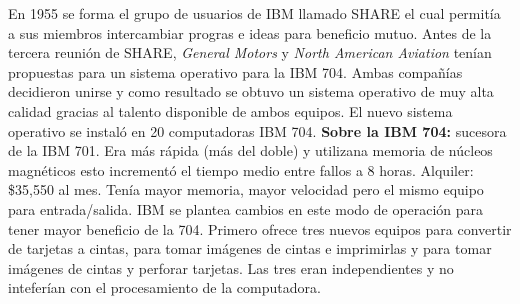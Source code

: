 En 1955 se forma el grupo de usuarios de \textsc{IBM} llamado \textsc{SHARE} el cual permitía a sus miembros intercambiar progras e ideas para beneficio mutuo. Antes de la tercera reunión de \textsc{SHARE}, \textit{General Motors} y \textit{North American Aviation} tenían propuestas para un sistema operativo para la \textsc{IBM 704}. Ambas compañías decidieron unirse y como resultado se obtuvo un sistema operativo de muy alta calidad gracias al talento disponible de ambos equipos. El nuevo sistema operativo se instaló en 20 computadoras \textsc{IBM 704}. \textbf{Sobre la \textsc{IBM 704}:} sucesora de la \textsc{IBM 701}. Era más rápida (más del doble) y utilizana memoria de núcleos magnéticos esto incrementó el tiempo medio entre fallos a 8 horas. Alquiler: \$35,550 al mes. Tenía mayor memoria, mayor velocidad pero el mismo equipo para entrada/salida. \textsc{IBM} se plantea cambios en este modo de operación para tener mayor beneficio de la 704. Primero ofrece tres nuevos equipos para convertir de tarjetas a cintas, para tomar imágenes de cintas e imprimirlas y para tomar imágenes de cintas y perforar tarjetas. Las tres eran independientes y no inteferían con el procesamiento de la computadora.\\


